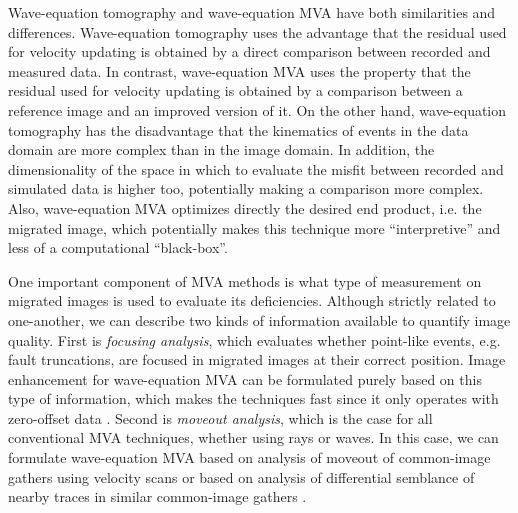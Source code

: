 Wave-equation tomography and wave-equation MVA have both similarities
and differences.
%
Wave-equation tomography uses the advantage that the residual used for
velocity updating is obtained by a direct comparison between recorded
and measured data. In contrast, wave-equation MVA uses the property
that the residual used for velocity updating is obtained by a
comparison between a reference image and an improved version of it.
%
On the other hand, wave-equation tomography has the disadvantage that
the kinematics of events in the data domain are more complex than in
the image domain. In addition, the dimensionality of the space in
which to evaluate the misfit between recorded and simulated data is
higher too, potentially making a comparison more complex.
%
Also, wave-equation MVA optimizes directly the desired end product,
i.e. the migrated image, which potentially makes this technique more
``interpretive'' and less of a computational ``black-box''.


One important component of MVA methods is what type of measurement on
migrated images is used to evaluate its deficiencies. Although
strictly related to one-another, we can describe two kinds of
information available to quantify image quality. First is
\textit{focusing analysis}, which evaluates whether point-like events,
e.g. fault truncations, are focused in migrated images at their
correct position. Image enhancement for wave-equation MVA can be
formulated purely based on this type of information, which makes the
techniques fast since it only operates with zero-offset data
\cite[]{Sava.geo.fva}. Second is \textit{moveout analysis}, which is
the case for all conventional MVA techniques, whether using rays or
waves. In this case, we can formulate wave-equation MVA based on
analysis of moveout of common-image gathers using velocity scans
\cite[]{BiondiSava.segab.1999,SavaBiondi.gp.wemva1,SavaBiondi.gp.wemva2,SoubarasGratacos.2007}
or based on analysis of differential semblance of nearby traces in
similar common-image gathers \cite[]{ShenSymes.segab.2005}.


